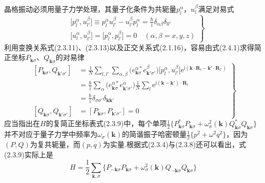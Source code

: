 晶格振动必须用量子力学处理，其量子化条件为共轭量$p_l^{\alpha}$，$u_l^{\beta}$满足对易式
\begin{equation}
\left.\begin{aligned}
  &\bigl[p_l^{\alpha},u_{l'}^{\beta}\bigr]\equiv p_l^{\alpha}u_{l'}^{\beta}
  -u_{l'}^{\beta}p_l^{\alpha}=\frac{\hbar}{\mathrm{i}}\delta_{\alpha\beta}\delta_{ll'}\\
  &\bigl[u_l^{\alpha},u_{l'}^{\beta}\bigr]
  =\bigl[p_l^{\alpha},p_{l'}^{\beta}\bigr]=0\quad(\alpha,\beta=x,y,z)
\end{aligned}\right\}
\end{equation}
利用变换关系式(2.3.11)、(2.3.13)以及正交关系式(2.1.16)，容易由式(2.4.1)求得简正坐标$P_{\boldsymbol{k}\sigma}$、$Q_{\boldsymbol{k}\sigma}$的对易律
\begin{equation}
\left.\begin{aligned}
  [P_{\boldsymbol{k}\sigma},Q_{\boldsymbol{k}'\sigma'}]
  &=\frac{1}{N}\sum_{l,l'}\sum_{\alpha,\beta}
  \bigl(e_{\boldsymbol{k}\sigma}^{\alpha *}e_{\boldsymbol{k}'\sigma'}^{\beta}\bigr)
  \bigl[p_l^{\alpha},u_{l'}^{\beta}\bigr]
  \mathrm{e}^{\mathrm{i}(\boldsymbol{k}\cdot\boldsymbol{R}_l-\boldsymbol{k}'\cdot\boldsymbol{R}_{l'})}\\
  &=\frac{\hbar}{\mathrm{i}}\sum_{\alpha}
  \bigl(e_{\boldsymbol{k}\sigma}^{\alpha *}e_{\boldsymbol{k}'\sigma'}^{\alpha}\bigr)
  \frac{1}{N}\sum_l\mathrm{e}^{\mathrm{i}(\boldsymbol{k}-\boldsymbol{k}')\cdot\boldsymbol{R}_l}\\
  &=\frac{\hbar}{\mathrm{i}}\delta_{\sigma\sigma'}\delta_{\boldsymbol{k}\boldsymbol{k}'}\\
  [Q_{\boldsymbol{k}\sigma},Q_{\boldsymbol{k}'\sigma'}]
  &=[P_{\boldsymbol{k}\sigma},P_{\boldsymbol{k}'\sigma'}]=0
\end{aligned}\right\}
\end{equation}
应当指出在$H$的复简正坐标表式(2.3.9)中，每个单项$\frac{1}{2}\bigl\{P_{\boldsymbol{k}\sigma}^{*}P_{\boldsymbol{k}\sigma}+\omega_{\sigma}^2(\boldsymbol{k})Q_{\boldsymbol{k}\sigma}^{*}Q_{\boldsymbol{k}\sigma}\bigr\}$并不对应于量子力学中频率为$\omega_{\sigma}(\boldsymbol{k})$的简谐振子哈密顿量$\frac{1}{2}\{p^2+\omega^2q^2\}$，因为$(P,Q)$为复共轭量，而$(p,q)$为实量.根据式(2.3.4)与(2.3.8)还可以看出，式(2.3.9)实际上是
\begin{equation}
  H=\frac{1}{2}\sum_{\boldsymbol{k},\sigma}\bigl\{P_{-\boldsymbol{k}\sigma}P_{\boldsymbol{k}\sigma}
  +\omega_{\sigma}^2(\boldsymbol{k})Q_{-\boldsymbol{k}\sigma}Q_{\boldsymbol{k}\sigma}\bigr\}
\end{equation}
